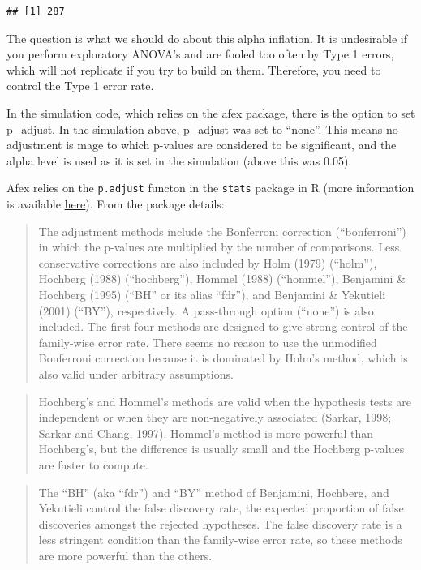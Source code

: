 \documentclass[]{book}
\begin{document}
\begin{verbatim}
## [1] 287
\end{verbatim}

The question is what we should do about this alpha inflation. It is undesirable if you perform exploratory ANOVA's and are fooled too often by Type 1 errors, which will not replicate if you try to build on them. Therefore, you need to control the Type 1 error rate.

In the simulation code, which relies on the afex package, there is the option to set p\_adjust. In the simulation above, p\_adjust was set to ``none''. This means no adjustment is mage to which p-values are considered to be significant, and the alpha level is used as it is set in the simulation (above this was 0.05).

Afex relies on the \texttt{p.adjust} functon in the \texttt{stats} package in R (more information is available \href{https://www.rdocumentation.org/packages/stats/versions/3.1.1/topics/p.adjust}{here}). From the package details:

\begin{quote}
The adjustment methods include the Bonferroni correction (``bonferroni'') in which the p-values are multiplied by the number of comparisons. Less conservative corrections are also included by Holm (1979) (``holm''), Hochberg (1988) (``hochberg''), Hommel (1988) (``hommel''), Benjamini \& Hochberg (1995) (``BH'' or its alias ``fdr''), and Benjamini \& Yekutieli (2001) (``BY''), respectively. A pass-through option (``none'') is also included. The first four methods are designed to give strong control of the family-wise error rate. There seems no reason to use the unmodified Bonferroni correction because it is dominated by Holm's method, which is also valid under arbitrary assumptions.
\end{quote}

\begin{quote}
Hochberg's and Hommel's methods are valid when the hypothesis tests are independent or when they are non-negatively associated (Sarkar, 1998; Sarkar and Chang, 1997). Hommel's method is more powerful than Hochberg's, but the difference is usually small and the Hochberg p-values are faster to compute.
\end{quote}

\begin{quote}
The ``BH'' (aka ``fdr'') and ``BY'' method of Benjamini, Hochberg, and Yekutieli control the false discovery rate, the expected proportion of false discoveries amongst the rejected hypotheses. The false discovery rate is a less stringent condition than the family-wise error rate, so these methods are more powerful than the others.
\end{quote}
\end{document}
